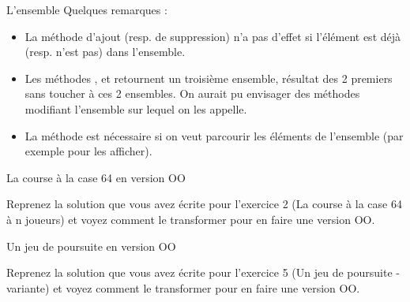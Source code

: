 \begin{Exercice}{L'ensemble}
	\medskip
	Quelques remarques :
	\begin{itemize}
		\item 
			La méthode d'ajout (resp. de suppression) n'a
			pas d'effet si l'élément est déjà
			(resp. n'est pas) dans l'ensemble.
		\item 
			Les méthodes , 
			 et 
			 retournent un troisième ensemble, 
			résultat des 2 premiers sans toucher
			à ces 2 ensembles. On aurait pu envisager des méthodes modifiant
			l'ensemble sur lequel on les appelle.
		\item 
			La méthode 
			est nécessaire si on veut parcourir les éléments de
			l'ensemble (par exemple pour les afficher).
	\end{itemize}
	
\end{Exercice}

\begin{Exercice}{La course à la case 64 en version OO}

	Reprenez la solution que vous avez écrite pour l'exercice 2
	(La course à la case 64 à n joueurs)
	et voyez comment le transformer pour en faire une version OO.
	
\end{Exercice}

\begin{Exercice}{Un jeu de poursuite en version OO}

	Reprenez la solution que vous avez écrite pour l'exercice 5
	(Un jeu de poursuite - variante)
	et voyez comment le transformer pour en faire une version OO.
	
\end{Exercice}
	
